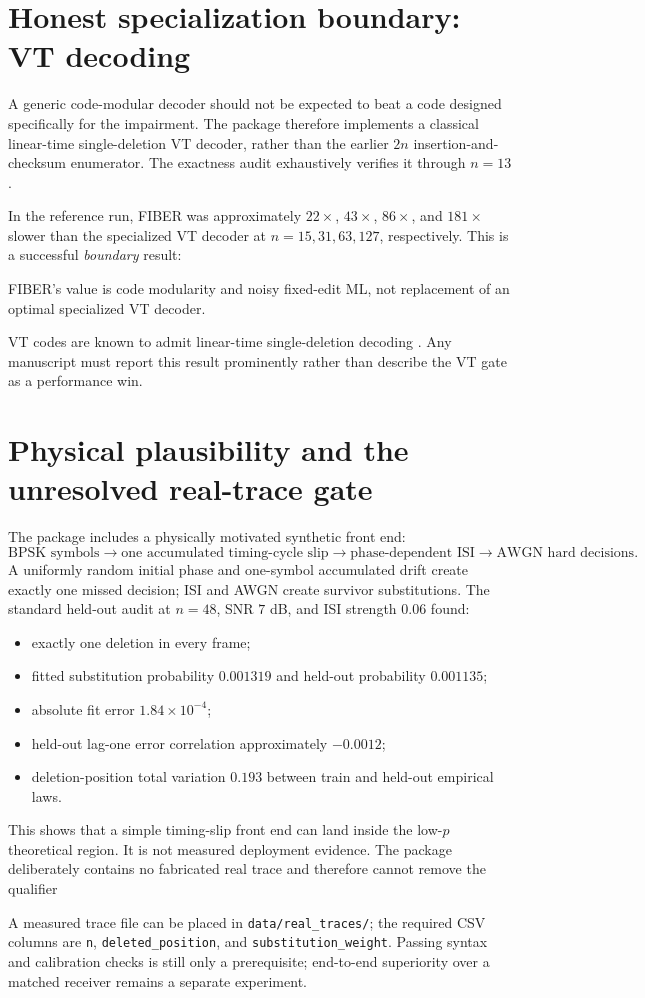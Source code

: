 \documentclass[11pt]{article}
\theoremstyle{definition}
\theoremstyle{remark}
\begin{document}
\section{Honest specialization boundary: VT decoding}
A generic code-modular decoder should not be expected to beat a code designed specifically for the impairment.  The package therefore implements a classical linear-time single-deletion VT decoder, rather than the earlier $2n$ insertion-and-checksum enumerator.  The exactness audit exhaustively verifies it through $n=13$.

In the reference run, FIBER was approximately $22\times$, $43\times$, $86\times$, and $181\times$ slower than the specialized VT decoder at $n=15,31,63,127$, respectively.  This is a successful \emph{boundary} result:
\begin{tcolorbox}[colback=gray!4,colframe=gray!55!black]
\centering FIBER's value is code modularity and noisy fixed-edit ML, not replacement of an optimal specialized VT decoder.
\end{tcolorbox}
VT codes are known to admit linear-time single-deletion decoding \cite{Abroshan2017}.  Any manuscript must report this result prominently rather than describe the VT gate as a performance win.

\section{Physical plausibility and the unresolved real-trace gate}
The package includes a physically motivated synthetic front end:
\[
\text{BPSK symbols}\to\text{one accumulated timing-cycle slip}\to\text{phase-dependent ISI}\to\text{AWGN hard decisions}.
\]
A uniformly random initial phase and one-symbol accumulated drift create exactly one missed decision; ISI and AWGN create survivor substitutions.  The standard held-out audit at $n=48$, SNR $7$ dB, and ISI strength $0.06$ found:
\begin{itemize}[leftmargin=2em]
\item exactly one deletion in every frame;
\item fitted substitution probability $0.001319$ and held-out probability $0.001135$;
\item absolute fit error $1.84\times10^{-4}$;
\item held-out lag-one error correlation approximately $-0.0012$;
\item deletion-position total variation $0.193$ between train and held-out empirical laws.
\end{itemize}
This shows that a simple timing-slip front end can land inside the low-$p$ theoretical region.  It is not measured deployment evidence.  The package deliberately contains no fabricated real trace and therefore cannot remove the qualifier
\begin{center}
\small{}
\end{center}
A measured trace file can be placed in \texttt{data/real\_traces/}; the required CSV columns are \texttt{n}, \texttt{deleted\_position}, and \texttt{substitution\_weight}.  Passing syntax and calibration checks is still only a prerequisite; end-to-end superiority over a matched receiver remains a separate experiment.
\end{document}
